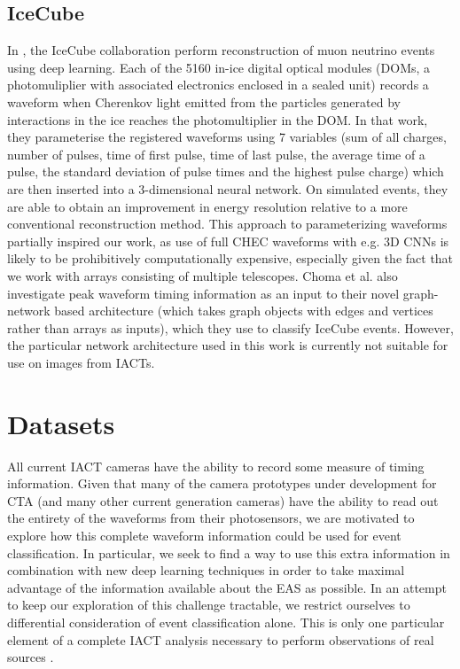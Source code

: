 \subsection{IceCube}
In \cite{icecube1}, the IceCube collaboration perform reconstruction of muon neutrino events using deep learning. Each of the 5160 in-ice digital optical modules (DOMs, a photomuliplier with associated electronics enclosed in a sealed unit) records a waveform when Cherenkov light emitted from the particles generated by interactions in the ice reaches the photomultiplier in the DOM. In that work, they parameterise the registered waveforms using 7 variables (sum of all charges, number of pulses, time of first pulse, time of last pulse, the average time of a pulse, the standard deviation of pulse times and the highest pulse charge) which are then inserted into a 3-dimensional neural network. On simulated events, they are able to obtain an improvement in energy resolution relative to a more conventional reconstruction method. This approach to parameterizing waveforms partially inspired our work, as use of full CHEC waveforms with e.g. 3D CNNs is likely to be prohibitively computationally expensive, especially given the fact that we work with arrays consisting of multiple telescopes. Choma et al. \cite{icecubegraph} also investigate peak waveform timing information as an input to their novel graph-network based architecture (which takes graph objects with edges and vertices rather than arrays as inputs), which they use to classify IceCube events. However, the particular network architecture used in this work is currently not suitable for use on images from IACTs.

\section{Datasets} \label{Datasets}

All current IACT cameras have the ability to record some measure of timing information. Given that many of the camera prototypes under development for CTA (and many other current generation cameras) have the ability to read out the entirety of the waveforms from their photosensors, we are motivated to explore how this complete waveform information could be used for event classification. In particular, we seek to find a way to use this extra information in combination with new deep learning techniques in order to take maximal advantage of the information available about the EAS as possible. In an attempt to keep our exploration of this challenge tractable, we restrict ourselves to differential consideration of event classification alone. This is only one particular element of a complete IACT analysis necessary to perform observations of real sources \cite{Berge07} \cite{LiMa}.

